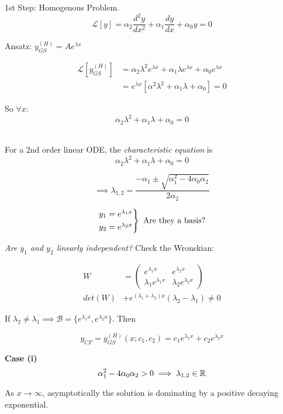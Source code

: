 \documentclass[twoside]{scrartcl}
\begin{document}
1st Step: Homogenous Problem. 
\[\mathcal{L}[y] = \alpha_2\frac{d^2y}{dx^2} + \alpha_1\frac{dy}{dx} + \alpha_0y = 0\]

Ansatz: $y_{GS}^{(H)} = Ae^{\lambda x}$

\[
\begin{aligned}
  \mathcal{L}[y_{GS}^{(H)}] &= \alpha_2\lambda^2e^{\lambda x}+ \alpha_1\lambda e^{\lambda x} + \alpha_0e^{\lambda x}\\
  &= e^{\lambda x}[\alpha^2\lambda^2 + \alpha_1\lambda + \alpha_0] = 0
\end{aligned}
\]

So $\forall x$: 
\[\alpha_2\lambda^2 +\alpha_1\lambda + \alpha_0 = 0\]~

\begin{definition}
For a 2nd order linear ODE, the \emph{characteristic equation} is
	\[\alpha_2\lambda^2 +\alpha_1\lambda + \alpha_0 = 0\]
\end{definition}


\[\implies \lambda_{1,2} = \frac{-\alpha_1 \pm \sqrt{\alpha_1^2 -4\alpha_0\alpha_2}}{2\alpha_2}\]

\[
  \begin{rcases*}
  y_1 = e^{\lambda_1x}\\
  y_2 = e^{\lambda_2x}	
  \end{rcases*}
  \mbox{ Are they a basis?}
\]

\emph{Are $y_1$ and $y_2$ linearly independent?} Check the Wronskian: 

\[
\begin{aligned}
  W &= \begin{pmatrix}
 e^{\lambda_1x} & e^{\lambda_2x}\\
 \lambda_1e^{\lambda_1x} & \lambda_2e^{\lambda_2x}	
 \end{pmatrix}\\[0.2cm]
 det(W) &+ e^{(\lambda_1+\lambda_2)x}(\lambda_2-\lambda_1) \neq 0
\end{aligned}
\]

If $\lambda_2 \neq \lambda_1 \implies \mathcal{B} = \{e^{\lambda_1x},e^{\lambda_2x}\}$. Then 

\[y_{CF} = y^{(H)}_{GS}(x;c_1,c_2) = c_1e^{\lambda_1x}+c_2e^{\lambda_2x}\]\vspace*{5pt}

\textbf{Case (i)} 
\[\alpha_1^2 - 4\alpha_0\alpha_2 > 0\implies \lambda_{1,2} \in\mathbb{R}\]

As $x \to \infty$, asymptotically the solution is dominating by a positive decaying exponential. \\
\end{document}

